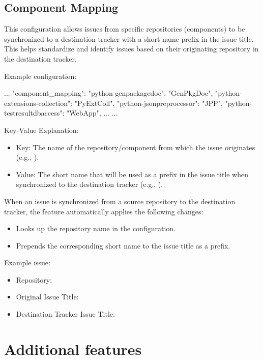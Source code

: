 \subsection{Component Mapping}
This configuration allows issues from specific repositories (components) to be
synchronized to a destination tracker with a short name prefix in the issue
title.
This helps standardize and identify issues based on their originating repository
in the destination tracker.

Example configuration:
\begin{pythoncode}
{
   ...
   "component_mapping": {
      "python-genpackagedoc": "GenPkgDoc",
      "python-extensions-collection": "PyExtColl",
      "python-jsonpreprocessor": "JPP",
      "python-testresultdbaccess": "WebApp",
      ...
   }
   ...
}
\end{pythoncode}

Key-Value Explanation:
\begin{itemize}
   \item Key: The name of the repository/component from which the issue
         originates (e.g., ).
   \item Value: The short name that will be used as a prefix in the issue title
         when synchronized to the destination tracker (e.g., ).
\end{itemize}

When an issue is synchronized from a source repository to the destination
tracker, the feature automatically applies the following changes:
\begin{itemize}
   \item Looks up the repository name in the  configuration.
   \item Prepends the corresponding short name to the issue title as a prefix.
\end{itemize}

Example issue:
\begin{itemize}
   \item Repository: 
   \item Original Issue Title: 
   \item Destination Tracker Issue Title: 
\end{itemize}

\hypertarget{additional-features}{%
\section{Additional features}\label{additional-features}}

